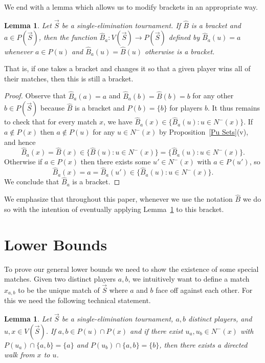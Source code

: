 \documentclass[12pt,letterpaper]{article}
\newtheorem{lem}[thm]{Lemma}
\theoremstyle{definition}
\renewcommand{\1}{\mathbbm{1}}
\newcommand{\tour}{\vec{S}}
\begin{document}
We end with a lemma which allows us to modify brackets in an appropriate way.
\begin{lem}\label{bracket modification}
	Let $\tour$ be a single-elimination tournament.  If $\widehat{B}$ is a bracket and $a\in P(\tour)$, then the function $\widehat{B}_a:V(\tour)\to P(\tour)$ defined by  $\widehat{B}_a(u)=a$ whenever $a\in P(u)$ and $\widehat{B}_a(u)=\widehat{B}(u)$ otherwise is a bracket.
\end{lem}
That is, if one takes a bracket and changes it so that a given player wins all of their matches, then this is still a bracket.
\begin{proof}
	Observe that $\widehat{B}_a(a)=a$ and $\widehat{B}_a(b)=\widehat{B}(b)=b$ for any other $b\in P(\tour)$ because $\widehat{B}$ is a bracket and $P(b)=\{b\}$ for players $b$.  It thus remains to check that for every match $x$, we have $\widehat{B}_a(x)\in \{\widehat{B}_a(u):u\in N^-(x)\}$.  If $a\notin P(x)$ then $a\notin P(u)$ for any $u\in N^-(x)$ by Proposition~\ref{Pu Sets}(v), and hence
	\[\widehat{B}_a(x)=\widehat{B}(x)\in \{\widehat{B}(u):u\in N^-(x)\}=\{\widehat{B}_a(u):u\in N^-(x)\}.\]
	Otherwise if $a\in P(x)$ then there exists some $u'\in N^-(x)$ with $a\in P(u')$, so
	\[\widehat{B}_a(x)=a=\widehat{B}_a(u')\in \{\widehat{B}_a(u):u\in N^-(x)\}.\]
	We conclude that $\widehat{B}_a$ is a bracket.
\end{proof}
We emphasize that throughout this paper, whenever we use the notation $\widehat{B}$ we do so with the intention of eventually applying Lemma~\ref{bracket modification} to this bracket.




\section{Lower Bounds}\label{sec:lower}

To prove our general lower bounds we need to show the existence of some special matches.  Given two distinct players $a,b$, we intuitively want to define a match $x_{a,b}$ to be the unique match of $\tour$ where $a$ and $b$ face off against each other.  For this we need the following technical statement.

\begin{lem}\label{matches have walks}
	Let $\tour$ be a single-elimination tournament, $a,b$ distinct players, and $u,x\in V(\tour)$.  If $a,b\in P(u)\cap P(x)$ and if there exist $u_a,u_b\in N^-(x)$ with $ P(u_a)\cap \{a,b\}=\{a\}$ and $P(u_b)\cap \{a,b\}=\{b\}$, then there exists a directed walk from $x$ to $u$. 
\end{lem}
\end{document}
